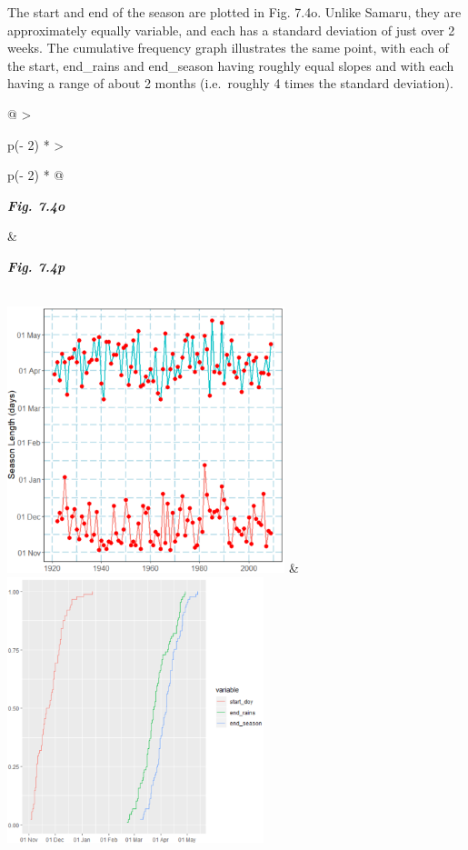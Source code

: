 \documentclass[
  letterpaper,
  DIV=11,
  numbers=noendperiod]{scrreprt}
\begin{document}
The start and end of the season are plotted in Fig. 7.4o. Unlike Samaru,
they are approximately equally variable, and each has a standard
deviation of just over 2 weeks. The cumulative frequency graph
illustrates the same point, with each of the start, end\_rains and
end\_season having roughly equal slopes and with each having a range of
about 2 months (i.e.~roughly 4 times the standard deviation).

\begin{longtable}[]{@{}
  >{\raggedright\arraybackslash}p{(\columnwidth - 2\tabcolsep) * }
  >{\raggedright\arraybackslash}p{(\columnwidth - 2\tabcolsep) * }@{}}
\toprule\noalign{}
\begin{minipage}[b]{\linewidth}\raggedright
\textbf{\emph{Fig. 7.4o}}
\end{minipage} & \begin{minipage}[b]{\linewidth}\raggedright
\textbf{\emph{Fig. 7.4p}}
\end{minipage} \\
\midrule\noalign{}
\endhead
\bottomrule\noalign{}
\endlastfoot
\includegraphics[width=3.18058in,height=3.05307in]{figures/Fig7.4o.png}
&
\includegraphics[width=2.94033in,height=3.04233in]{figures/Fig7.4p.png} \\
\end{longtable}
\end{document}
